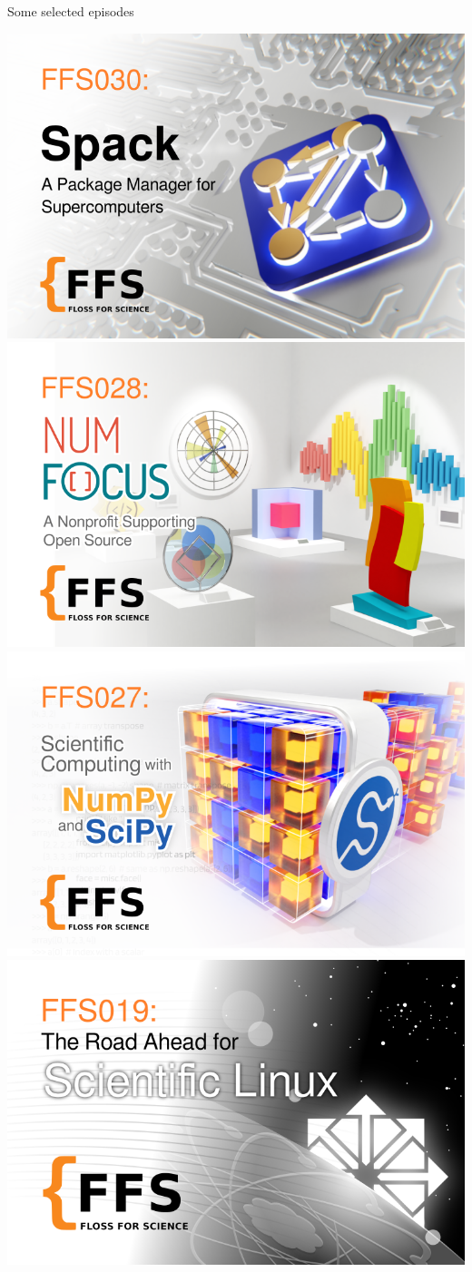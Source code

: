 \begin{frame}{Some selected episodes}
    \begin{minipage}{1\textwidth}
    \includegraphics[width=0.5\linewidth]{FFS030_header.png}
    \hfill
    \includegraphics[width=0.5\linewidth]{FFS028_header.png}\\
    \vspace{0.5cm}
    \includegraphics[width=0.5\linewidth]{FFS027_header.png}
    \hfill
    \includegraphics[width=0.5\linewidth]{FFS019_header.png}
  \end{minipage}
\end{frame}

